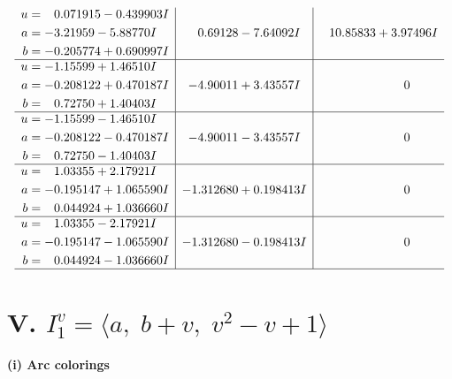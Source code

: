 \documentclass[1p]{elsarticle_modified}
\theoremstyle{definition}
\begin{document}
$$\begin{array}{c|c|c}
\begin{aligned}
u &= \phantom{-}0.071915 - 0.439903 I \\
a &= -3.21959 - 5.88770 I \\
b &= -0.205774 + 0.690997 I\end{aligned}
 & \phantom{-}0.69128 - 7.64092 I & \phantom{-}10.85833 + 3.97496 I \\ \hline\begin{aligned}
u &= -1.15599 + 1.46510 I \\
a &= -0.208122 + 0.470187 I \\
b &= \phantom{-}0.72750 + 1.40403 I\end{aligned}
 & -4.90011 + 3.43557 I & \phantom{-0.000000 } 0 \\ \hline\begin{aligned}
u &= -1.15599 - 1.46510 I \\
a &= -0.208122 - 0.470187 I \\
b &= \phantom{-}0.72750 - 1.40403 I\end{aligned}
 & -4.90011 - 3.43557 I & \phantom{-0.000000 } 0 \\ \hline\begin{aligned}
u &= \phantom{-}1.03355 + 2.17921 I \\
a &= -0.195147 + 1.065590 I \\
b &= \phantom{-}0.044924 + 1.036660 I\end{aligned}
 & -1.312680 + 0.198413 I & \phantom{-0.000000 } 0 \\ \hline\begin{aligned}
u &= \phantom{-}1.03355 - 2.17921 I \\
a &= -0.195147 - 1.065590 I \\
b &= \phantom{-}0.044924 - 1.036660 I\end{aligned}
 & -1.312680 - 0.198413 I & \phantom{-0.000000 } 0\\
 \hline 
 \end{array}$$\newpage\newpage\renewcommand{\arraystretch}{1}
\centering \section*{V. $I^v_{1}= \langle a,\;b+v,\;v^2- v+1 \rangle$}
\flushleft \textbf{(i) Arc colorings}\\
\end{document}

